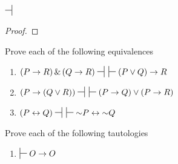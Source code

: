 {\begin{enumerate}[label=(\arabic*)]
{\vspace{5pt}
$\nsststile{}{}$
\vspace{5pt}

\begin{proof}
 
	\open
	 
		\open
		 
		 
		 
		 
		\close
	 
	 
	 
	\close
{} 
\end{proof}
\vspace{15pt}
}




\end{enumerate}

\noindent\problempart
Prove each of the following equivalences
\begin{enumerate}[label=(\arabic*)]

\item $(P \eif R) \eand (Q \eif R) \nsststile{}{} \hspace{.5em} \sststile{}{}(P \eor Q) \eif R $ %
\item $(P \eif (Q \eor R)) \nsststile{}{} \hspace{.5em} \sststile{}{} (P \eif Q) \eor (P \eif R)$ %
\item $(P \eiff Q)  \nsststile{}{} \hspace{.5em} \sststile{}{} \enot P \eiff \enot Q		$ %
\end{enumerate}


\noindent\problempart
Prove each of the following tautologies
\begin{enumerate}[label=(\arabic*)]

\item $\sststile{}{} O \eif O$		%

\end{enumerate}}
